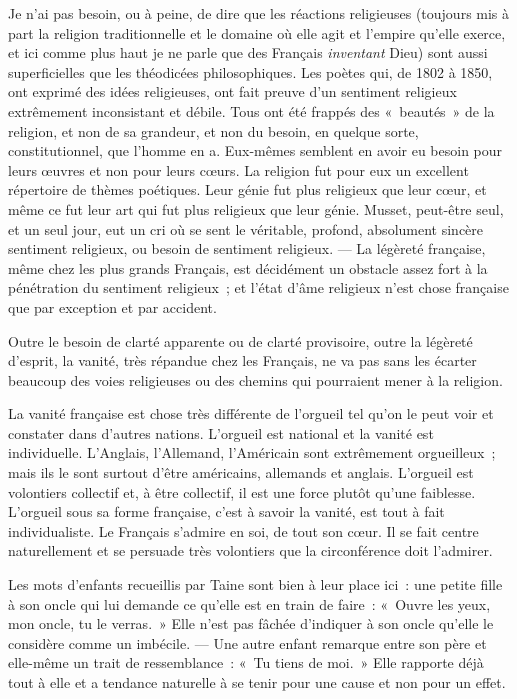 \documentclass[french,twoside]{book} %
\begin{document}
Je n’ai pas besoin, ou à peine, de dire que les réactions religieuses (toujours mis à part la religion traditionnelle et le domaine où elle agit et l’empire qu’elle exerce, et ici comme plus haut je ne parle que des Français {\itshape inventant} Dieu) sont aussi superficielles que les théodicées philosophiques. Les poètes qui, de 1802 à 1850, ont exprimé des idées religieuses, ont fait preuve d’un sentiment religieux extrêmement inconsistant et débile. Tous ont été frappés des « beautés » de la religion, et non de sa grandeur, et non du besoin, en quelque sorte, constitutionnel, que l’homme en a. Eux-mêmes semblent en avoir eu besoin pour leurs œuvres et non pour leurs cœurs. La religion fut pour eux un excellent répertoire de thèmes poétiques. Leur génie fut plus religieux que leur cœur, et même ce fut leur art qui fut plus religieux que leur génie. Musset, peut-être seul, et un seul jour, eut un cri où se sent le véritable, profond, absolument sincère sentiment religieux, ou besoin de sentiment religieux. — La légèreté française, même chez les plus grands Français, est décidément un obstacle assez fort à la pénétration du sentiment religieux ; et l’état d’âme religieux n’est chose française que par exception et par accident.\par
 Outre le besoin de clarté apparente ou de clarté provisoire, outre la légèreté d’esprit, la vanité, très répandue chez les Français, ne va pas sans les écarter beaucoup des voies religieuses ou des chemins qui pourraient mener à la religion.\par
La vanité française est chose très différente de l’orgueil tel qu’on le peut voir et constater dans d’autres nations. L’orgueil est national et la vanité est individuelle. L’Anglais, l’Allemand, l’Américain sont extrêmement orgueilleux ; mais ils le sont surtout d’être américains, allemands et anglais. L’orgueil est volontiers collectif et, à être collectif, il est une force plutôt qu’une faiblesse. L’orgueil sous sa forme française, c’est à savoir la vanité, est tout à fait individualiste. Le Français s’admire en soi, de tout son cœur. Il se fait centre naturellement et se persuade très volontiers que la circonférence doit l’admirer.\par
Les mots d’enfants recueillis par Taine sont bien à leur place ici : une petite fille à son oncle qui lui demande ce qu’elle est en train de faire : « Ouvre les yeux, mon oncle, tu le verras. » Elle n’est pas fâchée d’indiquer à son oncle qu’elle le considère comme un imbécile. — Une autre enfant remarque entre son père et elle-même un trait de ressemblance : « Tu tiens de moi. » Elle rapporte  déjà tout à elle et a tendance naturelle à se tenir pour une cause et non pour un effet.\par
\end{document}
